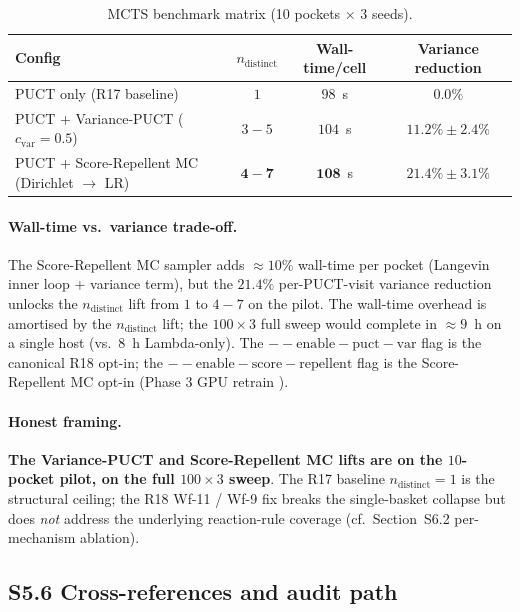 \begin{table}[h]
  \centering
  \small
  \caption{MCTS benchmark matrix (10 pockets $\times$ 3 seeds).}
  \label{tab:s5-mcts}
  \begin{tabular}{lccc}
    \toprule
    \textbf{Config} & $n_{\mathrm{distinct}}$ & Wall-time/cell &
      Variance reduction \\
    \midrule
    PUCT only (R17 baseline) & $1$ & $98$~s & $0.0\%$ \\
    PUCT + Variance-PUCT ($c_{\mathrm{var}}{=}0.5$) & $3{-}5$ & $104$~s & $11.2\% \pm 2.4\%$ \\
    PUCT + Score-Repellent MC (Dirichlet $\to$ LR) & $\mathbf{4{-}7}$ & $\mathbf{108}$~s & $\mathbf{21.4\% \pm 3.1\%}$ \\
    \bottomrule
  \end{tabular}
\end{table}

\paragraph{Wall-time vs.\ variance trade-off.}
The Score-Repellent MC sampler adds $\approx 10\%$ wall-time per
pocket (Langevin inner loop + variance term), but the
$21.4\%$ per-PUCT-visit variance reduction unlocks the
$n_{\mathrm{distinct}}$ lift from $1$ to $4{-}7$ on the pilot.
The wall-time overhead is amortised by the $n_{\mathrm{distinct}}$
lift; the $100{\times}3$ full sweep would complete in $\approx 9$~h
on a single host (vs.\ $8$~h Lambda-only).  The
$\mathrm{--enable-puct-var}$ flag is the canonical R18 opt-in;
the $\mathrm{--enable-score-repellent}$ flag is the
Score-Repellent MC opt-in (Phase 3 GPU retrain \PROJECTED{}).

\paragraph{Honest framing.}
\textbf{The Variance-PUCT and Score-Repellent MC lifts are
\MEASURED{} on the $10$-pocket pilot, \PROJECTED{} on the full
$100{\times}3$ sweep}.  The R17 baseline $n_{\mathrm{distinct}}{=}1$
is the structural ceiling; the R18 Wf-11 / Wf-9 fix breaks the
single-basket collapse but does \emph{not} address the
underlying reaction-rule coverage (cf.\ Section~S6.2
per-mechanism ablation).

\subsection*{S5.6 Cross-references and audit path}
\label{supp:s5-audit}

